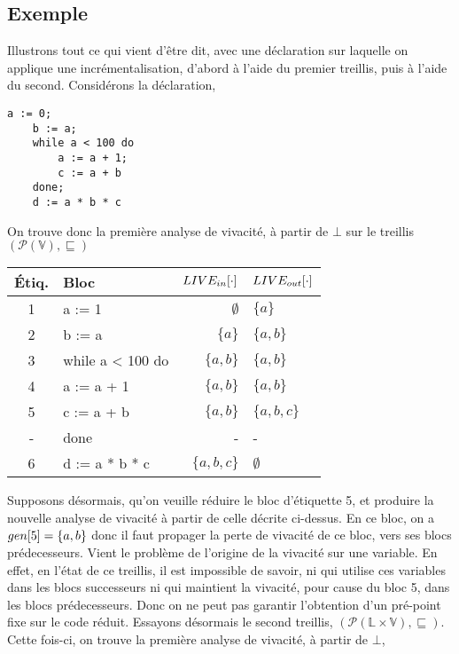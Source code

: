 \documentclass[a4paper, 12pt]{article}
\begin{document}
\subsection{Exemple}
Illustrons tout ce qui vient d'être dit, avec une déclaration sur laquelle on applique une incrémentalisation, d'abord à l'aide du premier
treillis, puis à l'aide du second. Considérons la déclaration,
\begin{lstlisting}[tabsize=2]
	a := 0;
	b := a;
	while a < 100 do
		a := a + 1;
		c := a + b
	done;
	d := a * b * c
\end{lstlisting}
On trouve donc la première analyse de vivacité, à partir de $\bot$ sur le treillis $(\mathcal{P}(\mathbb{V}), \sqsubseteq)$
\begin{center}
	\begin{tabular}{||c|l|r|l||}
	\hline
	Étiq. & Bloc & $LIVE_{in}[\cdot]$ & $LIVE_{out}[\cdot]$ \\
	\hline
	1 & a := 1 & $\emptyset$ & $\{a\}$\\
	2 & b := a & $\{a\}$ & $\{a, b\}$\\
	3 & while a < 100 do & $\{a, b\}$ & $\{a, b\}$\\
	4 & a := a + 1 & $\{a, b\}$ & $\{a, b\}$\\
	5 & c := a + b & $\{a, b\}$ & $\{a, b, c\}$\\
	- & done & - & -\\
	6 & d := a * b * c & $\{a, b, c\}$ & $\emptyset$\\
	\hline
	\end{tabular}
\end{center}
Supposons désormais, qu'on veuille réduire le bloc d'étiquette 5, et produire la nouvelle analyse de vivacité
à partir de celle décrite ci-dessus. En ce bloc, on a $gen[5] = \{a, b\}$ donc il faut propager la perte de vivacité
de ce bloc, vers ses blocs prédecesseurs. Vient le problème de l'origine de la vivacité sur une variable. En effet,
en l'état de ce treillis, il est impossible de savoir, ni qui utilise ces variables dans les blocs successeurs ni qui
maintient la vivacité, pour cause du bloc 5, dans les blocs prédecesseurs. Donc on ne peut pas garantir l'obtention d'un
pré-point fixe sur le code réduit. Essayons désormais le second treillis, 
$(\mathcal{P}(\mathbb{L} \times \mathbb{V}), \sqsubseteq)$. Cette fois-ci, on trouve la première analyse de vivacité, à partir
de $\bot$,
\end{document}
